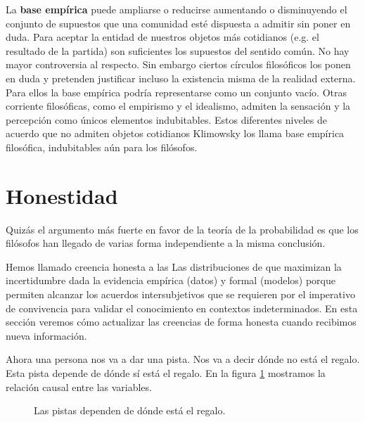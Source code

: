 \documentclass[a4paper,10pt]{book}
\begin{document}

La \textbf{base empírica} puede ampliarse o reducirse aumentando o disminuyendo el conjunto de supuestos que una comunidad esté dispuesta a admitir sin poner en duda.
Para aceptar la entidad de nuestros objetos más cotidianos (e.g. el resultado de la partida) son suficientes los supuestos del sentido común.
No hay mayor controversia al respecto.
Sin embargo ciertos círculos filosóficos los ponen en duda y pretenden justificar incluso la existencia misma de la
realidad externa. Para ellos la base empírica podría representarse como un conjunto vacío. Otras
corriente filosóficas, como el empirismo y el idealismo, admiten la sensación y la percepción como
únicos elementos indubitables. Estos diferentes niveles de acuerdo que no admiten objetos
cotidianos Klimowsky los llama base empírica filosófica, indubitables aún para los filósofos.






\section{Honestidad}

Quizás el argumento más fuerte en favor de la teoría de la probabilidad es que los filósofos han llegado de varias forma independiente a la misma conclusión.



Hemos llamado creencia honesta a las Las distribuciones de que maximizan la incertidumbre dada la evidencia empírica (datos) y formal (modelos) porque permiten alcanzar los acuerdos intersubjetivos que se requieren por el imperativo de convivencia para validar el conocimiento en contextos indeterminados.
En esta sección veremos cómo actualizar las creencias de forma honesta cuando recibimos nueva información.


Ahora una persona nos va a dar una pista.
Nos va a decir dónde no está el regalo.
Esta pista depende de dónde sí está el regalo.
En la figura \ref{fig:modelo_causal_base} mostramos la relación causal entre las variables.
\begin{figure}[H]     
 \centering
  \caption{Las pistas dependen de dónde está el regalo.}
  \label{fig:modelo_causal_base}
\end{figure}
\end{document}
